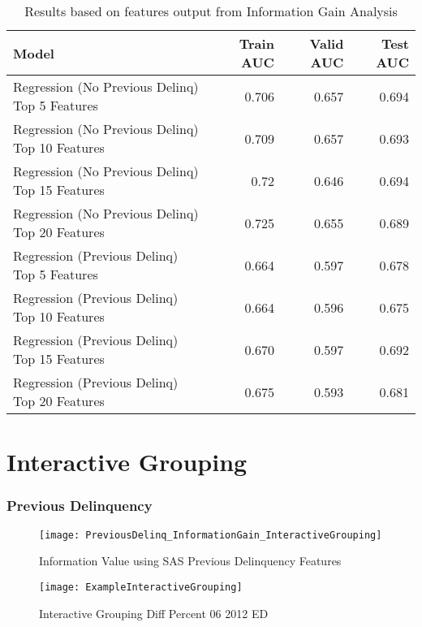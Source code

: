 \begin{table}[H]
	\centering
	\resizebox{\textwidth}{!}
	{
		\begin{tabular}{l | r | r| r}
			\hline
			\textbf{Model} & \textbf{Train AUC} & \textbf{Valid AUC} &  \textbf{Test AUC} \\
			\hline
			Regression (No Previous Delinq) Top 5 Features & 0.706 & 0.657 & 0.694  \\
			Regression (No Previous Delinq) Top 10 Features & 0.709 & 0.657 & 0.693  \\
			Regression (No Previous Delinq) Top 15 Features & 0.72 & 0.646 & 0.694  \\
			Regression (No Previous Delinq) Top 20 Features & 0.725 & 0.655 & 0.689  \\
			\hline
			
			Regression (Previous Delinq) Top 5 Features &  0.664 &  0.597 &  0.678  \\
			Regression (Previous Delinq) Top 10 Features &  0.664 &  0.596 &  0.675  \\
			Regression (Previous Delinq) Top 15 Features &  0.670 &  0.597 &  0.692  \\
			Regression (Previous Delinq) Top 20 Features &  0.675 &  0.593 &  0.681  \\		
			\hline
		\end{tabular}
	}
	\caption{Results based on features output from Information Gain Analysis}
	\label{table:featureselection_base_model}
\end{table}


\section{Interactive Grouping}

\subsubsection{Previous Delinquency}
\begin{figure}[H]
	\texttt{[image: PreviousDelinq\_InformationGain\_InteractiveGrouping]}
	\caption{Information Value using SAS Previous Delinquency Features}
	\label{fig:Information Value using SAS Previous Delinquency Features}
\end{figure}

\begin{figure}[H]
	\texttt{[image: ExampleInteractiveGrouping]}
	\caption{Interactive Grouping Diff Percent 06 2012 ED}
	\label{fig:Interactive Grouping Diff Percent 06 2012 ED}
\end{figure}

